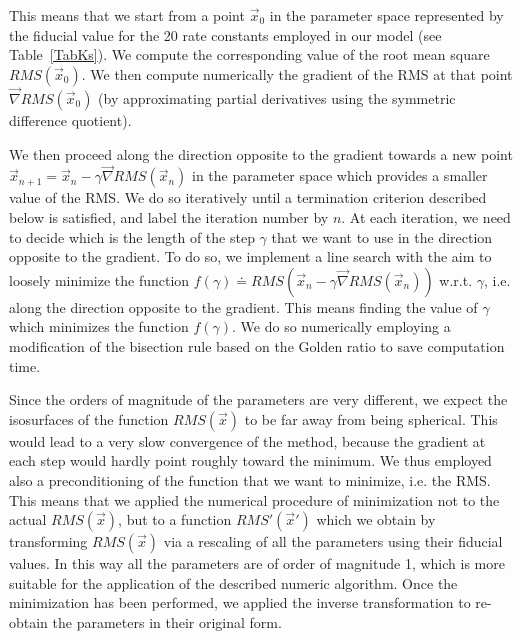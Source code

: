 \documentclass[oneside, 10pt, a4paper, twocolumn]{article}
\begin{document}
This means that we start from a point $\vec{x}_0$ in the parameter space represented by the fiducial value for the 20 rate constants employed in our model (see Table~\ref{TabKs}). We compute the corresponding value of the root mean square $RMS\left(\vec{x}_0\right)$. We then compute numerically the gradient of the RMS at that point $\vec{\nabla}RMS\left(\vec{x}_0\right)$ (by approximating partial derivatives using the symmetric difference quotient). 


We then proceed along the direction opposite to the gradient towards a new point \mbox{$\vec{x}_{n+1} = \vec{x}_{n} - \gamma\vec{\nabla}RMS\left(\vec{x}_n\right)$} in the parameter space which provides a smaller value of the RMS. We do so iteratively until a termination criterion described below is satisfied, and label the iteration number by $n$.
At each iteration, we need to decide which is the length of the step $\gamma$ that we want to use in the direction opposite to the gradient. To do so, we implement a line search with the aim to loosely minimize the function $f\left(\gamma\right) \doteq RMS\left(\vec{x}_{n} - \gamma\vec{\nabla}RMS\left(\vec{x}_n\right)\right)$ w.r.t. $\gamma$, i.e. along the direction opposite to the gradient. This means finding the value of $\gamma$ which minimizes the function $f\left(\gamma\right)$. We do so numerically employing a modification of the bisection rule based on the Golden ratio to save computation time. 

Since the orders of magnitude of the parameters are very different, we expect the isosurfaces of the function $RMS\left(\vec{x}\right)$ to be far away from being spherical. This would lead to a very slow convergence of the method, because the gradient at each step would hardly point roughly toward the minimum. We thus employed also a preconditioning of the function that we want to minimize, i.e. the RMS. This means that we applied the numerical procedure of minimization not to the actual $RMS\left(\vec{x}\right)$, but to a function $RMS'\left(\vec{x}'\right)$ which we obtain by transforming $RMS\left(\vec{x}\right)$ via a rescaling of all the parameters using their fiducial values. In this way all the parameters are of order of magnitude 1, which is more suitable for the application of the described numeric algorithm. Once the minimization has been performed, we applied the inverse transformation to re-obtain the parameters in their original form.
\end{document}
